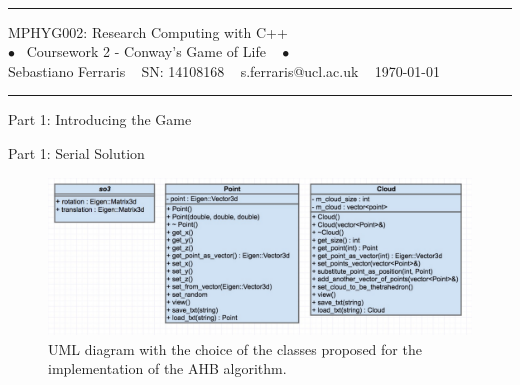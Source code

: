 \documentclass[11pt, twoside]{article}
\newcommand{\cambiaFont}[2]{{\fontencoding{T1}\fontfamily{#1}%
		\selectfont#2}}
\begin{document}
\setcounter{page}{1}
\pagestyle{fancy} 



~\vspace{-2cm} 
\begin{center}  	
	
	\hrule
	
	\vspace{0.5cm} 
	\color{Black} MPHYG002: Research Computing with C++ \color{Black}
	\vspace{0.5cm} \\
	\cambiaFont{ppl}{ \color{MidnightBlue} $\bullet$ \color{MidnightBlue} ~{\Large Coursework 2 - Conway's Game of Life } ~ \color{MidnightBlue}$\bullet$\color{black}} 
	\vspace{0.3cm} \\
	Sebastiano Ferraris  ~ SN: 14108168 ~  s.ferraris@ucl.ac.uk ~ \today 
	\vspace{0.5cm} 
	\hrule
	
\end{center}

\vspace{0.1in}







\begin{center}
	\color{MidnightBlue} {\Large Part 1: Introducing the Game }\color{Black} 
\end{center}


\begin{center}
	\color{MidnightBlue} {\Large Part 1: Serial Solution }\color{Black} 
\end{center}


\begin{figure}[htbp]
	\centering
	\includegraphics[scale=0.35]{figures/uml_diag.pdf}
	\caption{UML diagram with the choice of the classes proposed for the implementation of the AHB algorithm.}
	\label{fig:uml_diagram_classes}
\end{figure}
\end{document}
